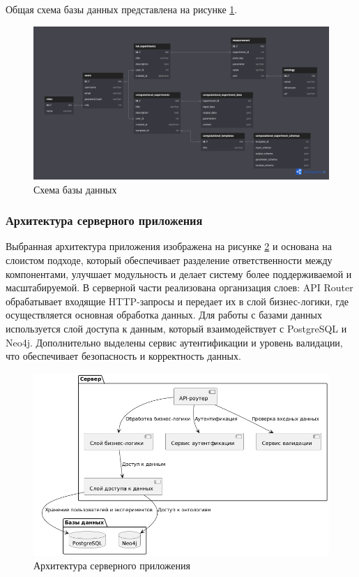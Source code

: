 Общая схема базы данных представлена на рисунке \ref{pic:db}.

\begin{figure}[H]
	\centering
	\includegraphics[width=\linewidth]{chapters/img/database_scheme.png}
	\caption{Схема базы данных}
	\label{pic:db}
\end{figure}


\subsubsection{Архитектура серверного приложения}

Выбранная архитектура приложения изображена на рисунке \ref{pic:server_arch} и основана на слоистом подходе, который обеспечивает разделение ответственности между компонентами, улучшает модульность и делает систему более поддерживаемой и масштабируемой. В серверной части реализована организация слоев: API Router обрабатывает входящие HTTP-запросы и передает их в слой бизнес-логики, где осуществляется основная обработка данных. Для работы с базами данных используется слой доступа к данным, который взаимодействует с PostgreSQL и Neo4j. Дополнительно выделены сервис аутентификации и уровень валидации, что обеспечивает безопасность и корректность данных.

\begin{figure}[H]
	\centering
	\includegraphics[width=0.7\linewidth]{chapters/img/server_arch.png}
	\caption{Архитектура серверного приложения}
	\label{pic:server_arch}
\end{figure}

